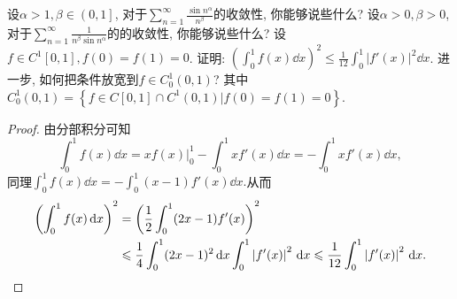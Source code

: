 \begin{quizb}
\begin{solution}
\end{solution}
\woe 设\(\alpha>1,\beta\in\left(0,1\right]\), 对于\(\sum_{n=1}^{\infty}\frac{\sin n^\alpha}{n^\beta}\)的收敛性, 你能够说些什么?
\woe 设\(\alpha>0,\beta>0\), 对于\(\sum_{n=1}^{\infty}\frac{1}{n^\beta\sin n^\alpha}\)的的收敛性, 你能够说些什么?
\woe 设\(f\in C^1[0,1],f(0)=f(1)=0\). 证明: \(\left(\int_{0}^{1}f(x)\dd x\right)^2\leqslant\frac{1}{12}\int_{0}^{1}|f'(x)|^2\dd x\). 进一步, 如何把条件放宽到\(f\in C_0^1(0,1)\)? 其中\(C_0^1(0,1)=\left\lbrace f\in C[0,1]\cap C^1(0,1)\big|f(0)=f(1)=0\right\rbrace \).
\begin{proof}
由分部积分可知\[\int_{0}^{1}f(x)\dd x=xf(x)\big|_0^1-\int_{0}^{1}xf'(x)\dd x=-\int_{0}^{1}xf'(x)\dd x,\]同理\(\int_{0}^{1}f(x)\dd x=-\int_{0}^{1}(x-1)f'(x)\dd x.\)从而\[\begin{split}
\left(\int_{0}^{1}f(x)\,\mathrm{d} x\right)^2&=\left(\frac{1}{2}\int_{0}^{1}(2x-1)f'(x)\right)^2\\
&\leqslant\frac{1}{4}\int_{0}^{1}(2x-1)^2\,\mathrm{d} x\int_{0}^{1}\left|f'(x)\right|^2\,\mathrm{d} x\leqslant \frac{1}{12}\int_{0}^{1}\left|f'(x)\right|^2\,\mathrm{d} x.\qedhere
\end{split}\]
\end{proof}
\end{quizb}
